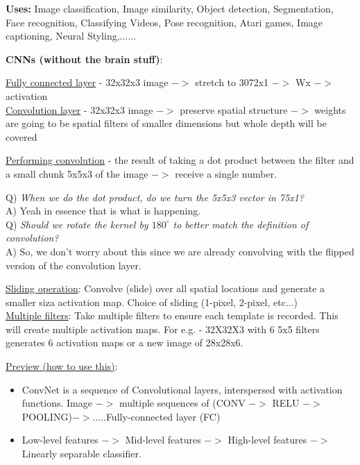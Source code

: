 \documentclass[twoside]{article}
\begin{document}
\textbf{Uses:} Image classification, Image similarity,  Object detection, Segmentation, Face recognition, Classifying Videos, Pose recognition, Atari games, Image captioning, Neural Styling,......

\textbf{CNNs (without the brain stuff)}:

\underline{Fully connected layer} - 32x32x3 image $->$ stretch to 3072x1 $->$ Wx $->$ activation
\\

\underline{Convolution layer} - 32x32x3 image $->$ preserve spatial structure $->$ weights are going to be spatial filters of smaller dimensions but whole depth will be covered


\item \underline{Performing convolution} - the result of taking a dot product between the filter and a small chunk 5x5x3 of the image $->$ receive a single number.


Q) \textit{When we do the dot product, do we turn the 5x5x3 vector in 75x1?}\\
A) Yeah in essence that is what is happening.
\\

Q) \textit{Should we rotate the kernel by $180^{\circ}$ to better match the definition of convolution?}\\
A) So, we don't worry about this since we are already convolving with the flipped version of the convolution layer.

\underline{Sliding operation}: Convolve (slide) over all spatial locations and generate a smaller siza activation map.  Choice of sliding (1-pixel, 2-pixel, etc...)\\

\underline{Multiple filters}:  Take multiple filters to ensure each template is recorded. This will create multiple activation maps. For e.g. - 32X32X3 with 6 5x5 filters generates 6 activation maps or a new image of 28x28x6.

\underline{Preview (how to use this)}: 
\begin{itemize}
    \item ConvNet is a sequence of Convolutional layers, interspersed with activation functions. Image $->$ multiple sequences of (CONV $->$ RELU $->$ POOLING)$->$.....Fully-connected layer (FC)
    \item Low-level features $->$ Mid-level features $->$ High-level features $->$ Linearly separable classifier.
\end{itemize}
\end{document}
